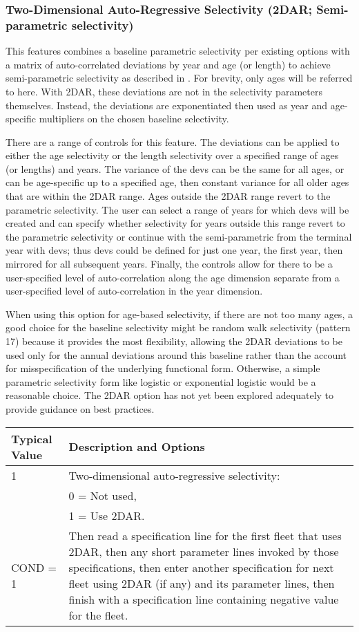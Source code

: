 \subsubsection{Two-Dimensional Auto-Regressive Selectivity (2DAR; Semi-parametric selectivity)}
This features combines a baseline parametric selectivity per existing options with a matrix of auto-correlated deviations by year and age (or length) to achieve semi-parametric selectivity as described in \citet{xu-new-2019}. For brevity, only ages will be referred to here. With 2DAR, these deviations are not in the selectivity parameters themselves. Instead, the deviations are exponentiated then used as year and age-specific multipliers on the chosen baseline selectivity.

There are a range of controls for this feature. The deviations can be applied to either the age selectivity or the length selectivity over a specified range of ages (or lengths) and years. The variance of the devs can be the same for all ages, or can be age-specific up to a specified age, then constant variance for all older ages that are within the 2DAR range. Ages outside the 2DAR range revert to the parametric selectivity. The user can select a range of years for which devs will be created and can specify whether selectivity for years outside this range revert to the parametric selectivity or continue with the semi-parametric from the terminal year with devs; thus devs could be defined for just one year, the first year, then mirrored for all subsequent years. Finally, the controls allow for there to be a user-specified level of auto-correlation along the age dimension separate from a user-specified level of auto-correlation in the year dimension.

When using this option for age-based selectivity, if there are not too many ages, a good choice for the baseline selectivity might be random walk selectivity (pattern 17) because it provides the most flexibility, allowing the 2DAR deviations to be used only for the annual deviations around this baseline rather than the account for misspecification of the underlying functional form. Otherwise, a simple parametric selectivity form like logistic or exponential logistic would be a reasonable choice. The 2DAR option has not yet been explored adequately to provide guidance on best practices.

\begin{tabular}{p{2cm} p{14cm}}
	\hline
	Typical Value & Description and Options \Tstrut\Bstrut\\
	\hline
	1 \Tstrut & Two-dimensional auto-regressive selectivity: \\
	  & 0 = Not used, \\
	  & 1 = Use 2DAR. \\
	COND = 1 & Then read a specification line for the first fleet that uses 2DAR, then any short parameter lines invoked by those specifications, then enter another specification for next fleet using 2DAR (if any) and its parameter lines, then finish with a specification line containing negative value for the fleet. \Bstrut\\
	\hline
\end{tabular}

